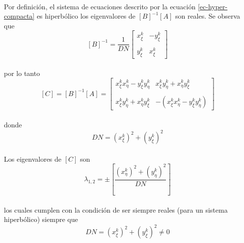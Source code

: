 \documentclass[letterpaper, openright, 12pt]{book}
\begin{document}
	\paragraph*{}
		Por definición, el sistema de ecuaciones descrito por la ecuación \ref{ec-hyper-compacta} es hiperbólico los eigenvalores de $\left[ B \right]^{-1} \left[ A \right]$ son reales. Se observa que\\
		\begin{equation*}
			\left[ B \right]^{-1} = \frac{1}{DN}\begin{bmatrix}
				x_{\xi}^{k} & -y_{\xi}^{k} \\ \\
				y_{\xi}^{k} & x_{\xi}^{k}
			\end{bmatrix}
		\end{equation*}\\
		por lo tanto
		\begin{equation*}
			\left[ C \right] = \left[ B \right]^{-1} \left[ A \right] = \begin{bmatrix}
				x_{\xi}^{k} x_{\eta}^{k} - y_{\xi}^{k} y_{\eta}^{k} &
				x_{\xi}^{k} y_{\eta}^{k} + x_{\eta}^{k} y_{\xi}^{k} \\ \\
				x_{\xi}^{k} y_{\eta}^{k} + x_{\eta}^{k} y_{\xi}^{k} &
				- \left( x_{\xi}^{k} x_{\eta}^{k} - y_{\xi}^{k} y_{\eta}^{k} \right)
			\end{bmatrix}
		\end{equation*}\\
		donde
		\begin{equation*}
			DN = \left( x_{\xi}^{k} \right)^2 + \left( y_{\xi}^{k} \right)^2
		\end{equation*}
	
	\paragraph*{}
		Los eigenvalores de $\left[ C \right]$ son
		\begin{equation*}
			\lambda_{1, 2} = \pm \left[ \frac{\left(x_{\eta}^{k} \right)^2 + \left( y_{\eta}^{k} \right)^2} {DN} \right]
		\end{equation*}\\
		los cuales cumplen con la condición de ser siempre reales (para un sistema hiperbólico) siempre que
		\begin{equation*}
		DN = \left( x_{\xi}^{k} \right)^2 + \left( y_{\xi}^{k} \right)^2 \neq 0
		\end{equation*}
\end{document}
